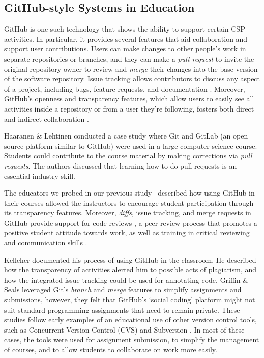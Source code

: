 \subsection{GitHub-style Systems in Education}
GitHub is one such technology that shows the ability to support certain CSP activities. In particular, it provides several features that aid collaboration and support user contributions. Users can make changes to other people's work in separate repositories or branches, and they can make a \emph{pull request} to invite the original repository owner to review and \emph{merge} their changes into the base version of the software repository. Issue tracking allows contributors to discuss any aspect of a project, including bugs, feature requests, and documentation \cite{bissyande2013got}. Moreover, GitHub's openness and transparency features, which allow users to easily see all activities inside a repository or from a user they're following, fosters both direct and indirect collaboration \cite{dabbish2012social}.

Haaranen \& Lehtinen \cite{haaranen2015teaching} conducted a case study where Git and GitLab (an open source platform similar to GitHub) were used in a large computer science course. Students could contribute to the course material by making corrections via \emph{pull requests}. The authors discussed that learning how to do pull requests is an essential industry skill.

The educators we probed in our previous study~\cite{zagalsky2015emergence} described how using GitHub in their courses allowed the instructors to encourage student participation through its transparency features. Moreover, \emph{diffs}, issue tracking, and merge requests in GitHub provide support for code reviews \cite{kalliamvakou2014promises}, a peer-review process that promotes a positive student attitude towards work, as well as training in critical reviewing and communication skills \cite{hundhausen2013talking}.

Kelleher \cite{kelleher2014employing} documented his process of using GitHub in the classroom. He described how the transparency of activities alerted him to possible acts of plagiarism, and how the integrated issue tracking could be used for annotating code. Griffin \& Seals \cite{griffin2013github} leveraged Git's \emph{branch} and \emph{merge} features to simplify assignments and submissions, however, they felt that GitHub's `social coding' platform might not suit standard programming assignments that need to remain private. These studies follow early examples of an educational use of other version control tools, such as Concurrent Version Control (CVS) \cite{reid2005learning} and Subversion \cite{clifton2007subverting}. In most of these cases, the tools were used for assignment submission, to simplify the management of courses, and to allow students to collaborate on work more easily.
